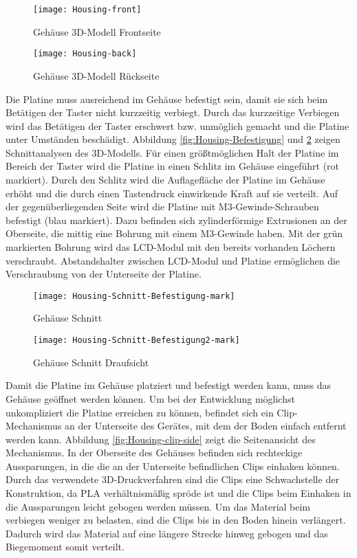 \begin{figure}[h]
	\begin{minipage}{.45\linewidth}
		\centering
		\texttt{[image: Housing-front]}
		\caption{Gehäuse 3D-Modell Frontseite}
		\label{fig:Housing-front}
	\end{minipage}
	\hfill
	\begin{minipage}{.45\linewidth}
		\centering
		\texttt{[image: Housing-back]}
		\caption{Gehäuse 3D-Modell Rückseite}
		\label{fig:Housing-back}
	\end{minipage}
\end{figure}
Die Platine muss ausreichend im Gehäuse befestigt sein, damit sie sich beim Betätigen der Taster nicht kurzzeitig verbiegt. Durch das kurzzeitige Verbiegen wird das Betätigen der Taster erschwert bzw. unmöglich gemacht und die Platine unter Umständen beschädigt. Abbildung \ref{fig:Housing-Befestigung} und \ref{fig:Housing-Befestigung2} zeigen Schnittanalysen des 3D-Modells. Für einen größtmöglichen Halt der Platine im Bereich der Taster wird die Platine in einen Schlitz im Gehäuse eingeführt (rot markiert). Durch den Schlitz wird die Auflagefläche der Platine im Gehäuse erhöht und die durch einen Tastendruck einwirkende Kraft auf sie verteilt. Auf der gegenüberliegenden Seite wird die Platine mit M3-Gewinde-Schrauben befestigt (blau markiert). Dazu befinden sich zylinderförmige Extrusionen an der Oberseite, die mittig eine Bohrung mit einem M3-Gewinde haben. Mit der grün markierten Bohrung wird das LCD-Modul mit den bereits vorhanden Löchern verschraubt. Abstandshalter zwischen LCD-Modul und Platine ermöglichen die Verschraubung von der Unterseite der Platine.
\begin{figure}[h]
	\begin{minipage}{.35\linewidth}
		\centering
		\texttt{[image: Housing-Schnitt-Befestigung-mark]}
		\caption{Gehäuse Schnitt}
		\label{fig:Housing-Befestigung}
	\end{minipage}
	\hfill
	\begin{minipage}{.55\linewidth}
		\centering
		\texttt{[image: Housing-Schnitt-Befestigung2-mark]}
		\caption{Gehäuse Schnitt Draufsicht}
		\label{fig:Housing-Befestigung2}
	\end{minipage}
\end{figure}
Damit die Platine im Gehäuse platziert und befestigt werden kann, muss das Gehäuse geöffnet werden können. Um bei der Entwicklung möglichst unkompliziert die Platine erreichen zu können, befindet sich ein Clip-Mechanismus an der Unterseite des Gerätes, mit dem der Boden einfach entfernt werden kann. Abbildung \ref{fig:Housing-clip-side} zeigt die Seitenansicht des Mechanismus. In der Oberseite des Gehäuses befinden sich rechteckige Aussparungen, in die die an der Unterseite befindlichen Clips einhaken können. Durch das verwendete 3D-Druckverfahren sind die Clips eine Schwachstelle der Konstruktion, da PLA verhältnismäßig spröde ist und die Clips beim Einhaken in die Aussparungen leicht gebogen werden müssen. Um das Material beim verbiegen weniger zu belasten, sind die Clips bis in den Boden hinein verlängert. Dadurch wird das Material auf eine längere Strecke hinweg gebogen und das Biegemoment somit verteilt.
